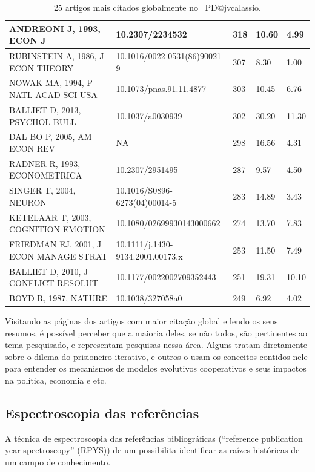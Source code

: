 \begin{table}[htp]
{\begin{tabular}{|l|l|l|l|l|}
        ANDREONI J, 1993, ECON J & 10.2307/2234532 & 318 & 10.60 & 4.99 \\ \hline
        RUBINSTEIN A, 1986, J ECON THEORY & 10.1016/0022-0531(86)90021-9 & 307 & 8.30 & 1.00 \\ \hline
        NOWAK MA, 1994, P NATL ACAD SCI USA & 10.1073/pnas.91.11.4877 & 303 & 10.45 & 6.76 \\ \hline
        BALLIET D, 2013, PSYCHOL BULL & 10.1037/a0030939 & 302 & 30.20 & 11.30 \\ \hline
        DAL BO P, 2005, AM ECON REV & NA & 298 & 16.56 & 4.31 \\ \hline
        RADNER R, 1993, ECONOMETRICA & 10.2307/2951495 & 287 & 9.57 & 4.50 \\ \hline
        SINGER T, 2004, NEURON & 10.1016/S0896-6273(04)00014-5 & 283 & 14.89 & 3.43 \\ \hline
        KETELAAR T, 2003, COGNITION EMOTION & 10.1080/02699930143000662 & 274 & 13.70 & 7.83 \\ \hline
        FRIEDMAN EJ, 2001, J ECON MANAGE STRAT & 10.1111/j.1430-9134.2001.00173.x & 253 & 11.50 & 7.49 \\ \hline
        BALLIET D, 2010, J CONFLICT RESOLUT & 10.1177/0022002709352443 & 251 & 19.31 & 10.10 \\ \hline
        BOYD R, 1987, NATURE & 10.1038/327058a0 & 249 & 6.92 & 4.02 \\ \hline
    \end{tabular}}
    \caption{25 artigos mais citados globalmente no \dataset\ PD@jvcalassio.}
    \label{tab:PD@jvcalassio:GlobalCitations}
\end{table}

Visitando as páginas dos artigos com maior citação global e lendo os seus resumos, é possível perceber que a maioria deles, se não todos, são pertinentes ao tema pesquisado, e representam pesquisas nessa área. Alguns tratam diretamente sobre o dilema do prisioneiro iterativo, e outros o usam os conceitos contidos nele para entender os mecanismos de modelos evolutivos cooperativos e seus impactos na política, economia e etc.

\subsection{Espectroscopia das referências}

A técnica de espectroscopia das referências bibliográficas (``reference publication year spectroscopy'' (RPYS)) de um \dataset\cite{marx_detecting_2014} possibilita identificar as raízes históricas  de um campo de conhecimento. 

